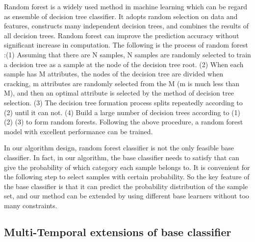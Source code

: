 \documentclass{isprs} %
\begin{document}
Random forest is a widely used method in machine learning which can be regard as ensemble of 
decision tree classifier. It adopts random selection on data and features, constructs many 
independent decision trees, and combines the results of all decision trees. Random forest can 
improve the prediction accuracy without significant increase in computation. The following is 
the process of random forest :(1) Assuming that there are N samples, N samples are randomly 
selected to train a decision tree as a sample at the node of the decision tree root. (2) When 
each sample has M attributes, the nodes of the decision tree are divided when cracking, m 
attributes are randomly selected from the M (m is much less than M), and then an optimal 
attribute is selected by the method of decision tree selection. (3) The decision tree formation 
process splits repeatedly according to (2) until it can not. (4) Build a large number of 
decision trees according to (1) (2) (3) to form random forests. Following the above procedure, 
a random forest model with excellent performance can be trained.

In our algorithm design, random forest classifier is not the only feasible base classifier. 
In fact, in our algorithm, the base classifier needs to satisfy that can give the probability 
of which category each sample belongs to. It is convenient for the following step to select 
samples with certain probability. So the key feature of the base classifier is that it can 
predict the probability distribution of the sample set, and our method can be extended by 
using different base learners without too many constraints.



\subsection{Multi-Temporal extensions of base classifier}\label{sec:Multi-Temporal extensions of base classifier}
\end{document}
